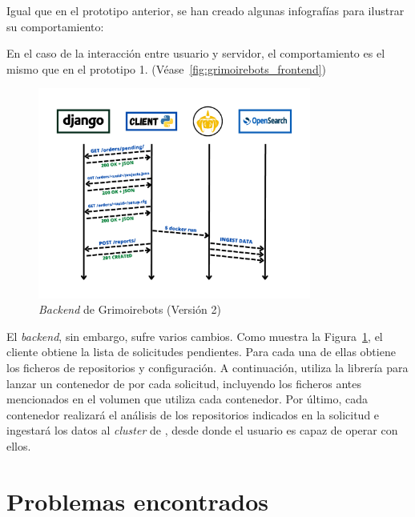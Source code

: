 Igual que en el prototipo anterior, se han creado algunas infografías para ilustrar su comportamiento:

En el caso de la interacción entre usuario y servidor, el comportamiento es el mismo que en el prototipo 1. (Véase~\ref{fig:grimoirebots_frontend})

\begin{figure}[ht]
    \centering
    \includegraphics[width=0.8\textwidth]{Figures/grimoirebots_ii_backend}
    \decoRule
    \caption[Grimoirebots II (\emph{Backend})]{\emph{Backend} de Grimoirebots (Versión 2)}
    \label{fig:grimoirebots_ii_backend}
\end{figure}

El \emph{backend}, sin embargo, sufre varios cambios. Como muestra la Figura~\ref{fig:grimoirebots_ii_backend}, el cliente obtiene la lista de solicitudes pendientes. Para cada una de ellas obtiene los ficheros de repositorios y configuración. A continuación, utiliza la librería  para lanzar un contenedor de  por cada solicitud, incluyendo los ficheros antes mencionados en el volumen que utiliza cada contenedor. Por último, cada contenedor realizará el análisis de los repositorios indicados en la solicitud e ingestará los datos al \emph{cluster} de , desde donde el usuario es capaz de operar con ellos.


\section{Problemas encontrados}

